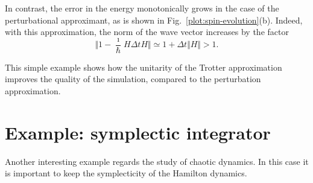 In contrast, the error in the energy monotonically grows in the case of the perturbational approximant, as is shown in Fig.~\ref{plot:spin-evolution}(b). Indeed, with this approximation, the norm of the wave vector increases by the factor
\begin{equation}
\Vert 1 - \frac{\imath}{\hbar} H \Delta t H \Vert \simeq 1 + \Delta t \Vert H \Vert > 1.
\end{equation}

This simple example shows how the unitarity of the Trotter approximation improves the quality of the simulation, compared to the perturbation approximation.

\section{Example: symplectic integrator}
Another interesting example regards the study of chaotic dynamics. In this case it is important to keep the symplecticity of the Hamilton dynamics.

